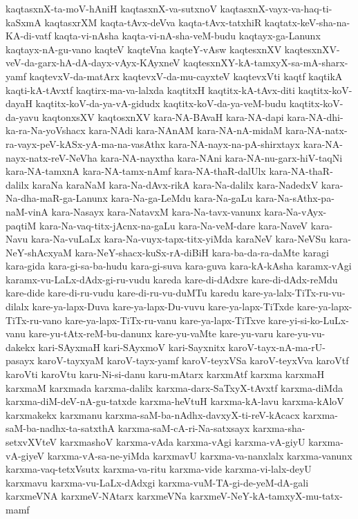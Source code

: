 {kaqtasxnX-ta-moV-hAniH
kaqtasxnX-va-sutxnoV
kaqtasxnX-vayx-va-haq-ti-kaSxmA
kaqtasxrXM
kaqta-tAvx-deVva
kaqta-tAvx-tatxhiR
kaqtatx-keV-sha-na-KA-di-vatf
kaqta-vi-nAsha
kaqta-vi-nA-sha-veM-budu
kaqtayx-ga-Lanunx
kaqtayx-nA-gu-vano
kaqteV
kaqteVna
kaqteY-vAsw
kaqtesxnXV
kaqtesxnXV-veV-da-garx-hA-dA-dayx-vAyx-KAyxneV
kaqtesxnXY-kA-tamxyX-sa-mA-sharx-yamf
kaqtevxV-da-matArx
kaqtevxV-da-mu-cayxteV
kaqtevxVti
kaqtf
kaqtikA
kaqti-kA-tAvxtf
kaqtirx-ma-va-lalxda
kaqtitxH
kaqtitx-kA-tAvx-diti
kaqtitx-koV-dayaH
kaqtitx-koV-da-ya-vA-gidudx
kaqtitx-koV-da-ya-veM-budu
kaqtitx-koV-da-yavu
kaqtonxsXV
kaqtosxnXV
kara-NA-BAvaH
kara-NA-dapi
kara-NA-dhi-ka-ra-Na-yoVshacx
kara-NAdi
kara-NAnAM
kara-NA-nA-midaM
kara-NA-natx-ra-vayx-peV-kASx-yA-ma-na-vasAthx
kara-NA-nayx-na-pA-shirxtayx
kara-NA-nayx-natx-reV-NeVha
kara-NA-nayxtha
kara-NAni
kara-NA-nu-garx-hiV-taqNi
kara-NA-tamxnA
kara-NA-tamx-nAmf
kara-NA-thaR-dalUlx
kara-NA-thaR-dalilx
karaNa
karaNaM
kara-Na-dAvx-rikA
kara-Na-dalilx
kara-NadedxV
kara-Na-dha-maR-ga-Lanunx
kara-Na-ga-LeMdu
kara-Na-gaLu
kara-Na-sAthx-pa-naM-vinA
kara-Nasayx
kara-NatavxM
kara-Na-tavx-vanunx
kara-Na-vAyx-paqtiM
kara-Na-vaq-titx-jAcnx-na-gaLu
kara-Na-veM-dare
kara-NaveV
kara-Navu
kara-Na-vuLaLx
kara-Na-vuyx-tapx-titx-yiMda
karaNeV
kara-NeVSu
kara-NeY-shAcxyaM
kara-NeY-shacx-kuSx-rA-diBiH
kara-ba-da-ra-daMte
karagi
kara-gida
kara-gi-sa-ba-hudu
kara-gi-suva
kara-guva
kara-kA-kAsha
karamx-vAgi
karamx-vu-LaLx-dAdx-gi-ru-vudu
kareda
kare-di-dAdxre
kare-di-dAdx-reMdu
kare-dide
kare-di-ru-vudu
kare-di-ru-vu-duMTu
karedu
kare-ya-lalx-TiTx-ru-vu-dilalx
kare-ya-lapx-Duva
kare-ya-lapx-Du-vuvu
kare-ya-lapx-TiTxde
kare-ya-lapx-TiTx-ru-vano
kare-ya-lapx-TiTx-ru-vanu
kare-ya-lapx-TiTxve
kare-yi-si-ko-LuLx-vanu
kare-yu-tAtx-reM-bu-danunx
kare-yu-vaMte
kare-yu-varu
kare-yu-vu-dakekx
kari-SAyxmaH
kari-SAyxmoV
kari-Sayxnitx
karoV-tayx-nA-ma-rU-pasayx
karoV-tayxyaM
karoV-tayx-yamf
karoV-teyxVSa
karoV-teyxVva
karoVtf
karoVti
karoVtu
karu-Ni-si-danu
karu-mAtarx
karxmAtf
karxma
karxmaH
karxmaM
karxmada
karxma-dalilx
karxma-darx-SaTxyX-tAvxtf
karxma-diMda
karxma-diM-deV-nA-gu-tatxde
karxma-heVtuH
karxma-kA-lavu
karxma-kAloV
karxmakekx
karxmanu
karxma-saM-ba-nAdhx-davxyX-ti-reV-kAcacx
karxma-saM-ba-nadhx-ta-satxthA
karxma-saM-cA-ri-Na-satxsayx
karxma-sha-setxvXVteV
karxmashoV
karxma-vAda
karxma-vAgi
karxma-vA-giyU
karxma-vA-giyeV
karxma-vA-sa-ne-yiMda
karxmavU
karxma-va-nanxlalx
karxma-vanunx
karxma-vaq-tetxVsutx
karxma-va-ritu
karxma-vide
karxma-vi-lalx-deyU
karxmavu
karxma-vu-LaLx-dAdxgi
karxma-vuM-TA-gi-de-yeM-dA-gali
karxmeVNA
karxmeV-NAtarx
karxmeVNa
karxmeV-NeY-kA-tamxyX-mu-tatx-mamf
}

